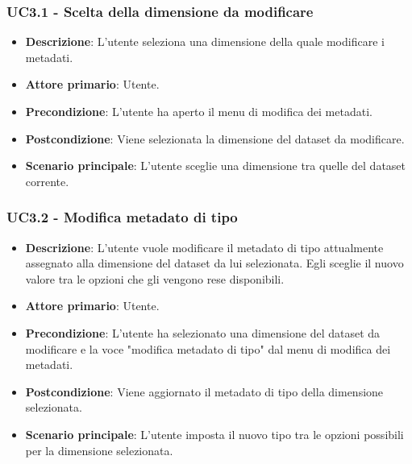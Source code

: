 \newpage

\subsubsection{UC3.1 - Scelta della dimensione da modificare}
\label{subsubsec:uc3.2}

\begin{itemize}
    \item \textbf{Descrizione}: L’utente seleziona una dimensione della quale modificare i metadati.	
    \item \textbf{Attore primario}: Utente.

    \item \textbf{Precondizione}:   L'utente ha aperto il menu di modifica dei metadati.
    \item \textbf{Postcondizione}:  Viene selezionata la dimensione del dataset da modificare.

	\item \textbf{Scenario principale}: L'utente sceglie una dimensione tra quelle del dataset corrente.
\end{itemize}

\subsubsection{UC3.2 - Modifica metadato di tipo}
\label{subsubsec:uc3.1}

\begin{itemize}
    \item \textbf{Descrizione}: L’utente vuole modificare il metadato di tipo attualmente assegnato 
                                alla dimensione del dataset da lui selezionata. Egli sceglie il nuovo valore tra le opzioni che gli vengono rese disponibili.
	
    \item \textbf{Attore primario}: Utente.
    
    \item \textbf{Precondizione}:   L'utente ha selezionato una dimensione del dataset  da modificare
                                    e la voce "modifica metadato di tipo" dal menu di modifica dei metadati.
    \item \textbf{Postcondizione}:  Viene aggiornato il metadato di tipo della dimensione selezionata.

	\item \textbf{Scenario principale}:
        L'utente imposta il nuovo tipo tra le opzioni possibili per la dimensione selezionata.
\end{itemize}


